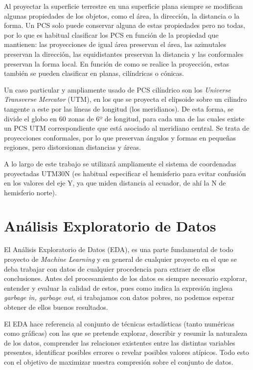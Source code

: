 \documentclass[12pt,a4paper,]{book}
\numberwithin{dummy}{section}
\theoremstyle{ocrenumbox}
\theoremstyle{blacknumex}
\theoremstyle{blacknumbox}
\theoremstyle{ocrenum}
\theoremstyle{ocrenum}
\begin{document}
Al proyectar la superficie terrestre en una superficie plana siempre se
modifican algunas propiedades de los objetos, como el área, la
dirección, la distancia o la forma. Un PCS solo puede conservar alguna
de estas propiedades pero no todas, por lo que es habitual clasificar
los PCS en función de la propiedad que mantienen: las proyecciones de
igual área preservan el área, las azimutales preservan la dirección, las
equidistantes preservan la distancia y las conformales preservan la
forma local. En función de como se realice la proyección, estas también
se pueden clasificar en planas, cilíndricas o cónicas.

Un caso particular y ampliamente usado de PCS cilíndrico son los
\emph{Universe Transverse Mercator} (UTM), en los que se proyecta el
elipsoide sobre un cilindro tangente a este por las líneas de longitud
(los meridianos). De esta forma, se divide el globo en 60 zonas de 6º de
longitud, para cada una de las cuales existe un PCS UTM correspondiente
que está asociado al meridiano central. Se trata de proyecciones
conformales, por lo que preservan ángulos y formas en pequeñas regiones,
pero distorsionan distancias y áreas.

A lo largo de este trabajo se utilizará ampliamente el sistema de
coordenadas proyectadas UTM30N (es habitual especificar el hemisferio
para evitar confusión en los valores del eje Y, ya que miden distancia
al ecuador, de ahí la N de hemisferio norte).

\hypertarget{anuxe1lisis-exploratorio-de-datos}{%
\section{Análisis Exploratorio de
Datos}\label{anuxe1lisis-exploratorio-de-datos}}

El Análisis Exploratorio de Datos (EDA), es una parte fundamental de
todo proyecto de \emph{Machine Learning} y en general de cualquier
proyecto en el que se deba trabajar con datos de cualquier procedencia
para extraer de ellos conclusiones. Antes del procesamiento de los datos
es siempre necesario explorar, entender y evaluar la calidad de estos,
pues como indica la expresión inglesa \emph{garbage in, garbage out}, si
trabajamos con datos pobres, no podemos esperar obtener de ellos buenos
resultados. \citep{wickham2016r}

El EDA hace referencia al conjunto de técnicas estadísticas (tanto
numéricas como gráficas) con las que se pretende explorar, describir y
resumir la naturaleza de los datos, comprender las relaciones existentes
entre las distintas variables presentes, identificar posibles errores o
revelar posibles valores atípicos. Todo esto con el objetivo de
maximizar nuestra compresión sobre el conjunto de datos.
\end{document}
